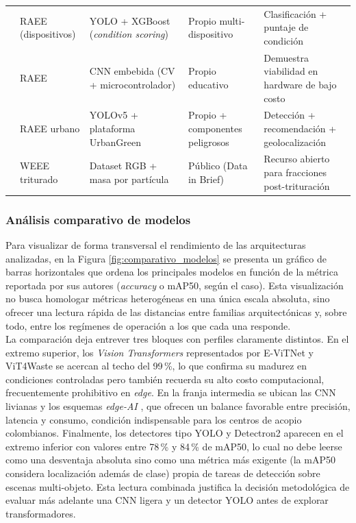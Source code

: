 \begin{table}[H]
{\begin{tabular}{p{3.4cm}p{2.6cm}p{3cm}p{3.5cm}p{4.5cm}}
\cite{menagaIntelligentDeviceCondition2026} & RAEE (dispositivos) & YOLO + XGBoost (\textit{condition scoring}) & Propio multi-dispositivo & Clasificación + puntaje de condición \\
\cite{ilievEmbeddedSystemEwaste2023} & RAEE & CNN embebida (CV + microcontrolador) & Propio educativo & Demuestra viabilidad en hardware de bajo costo \\
\cite{madusankaUrbanGreenEWasteDetection2025a} & RAEE urbano & YOLOv5 + plataforma UrbanGreen & Propio + componentes peligrosos & Detección + recomendación + geolocalización \\
\cite{vogelgesangMaterialFlowComposition2026} & WEEE triturado & Dataset RGB + masa por partícula & Público (Data in Brief) & Recurso abierto para fracciones post-trituración \\
\hline
\end{tabular}}
\end{table}

\subsubsection{Análisis comparativo de modelos}

Para visualizar de forma transversal el rendimiento de las arquitecturas analizadas, en la Figura \ref{fig:comparativo_modelos} se presenta un gráfico de barras horizontales que ordena los principales modelos en función de la métrica reportada por sus autores (\textit{accuracy} o mAP50, según el caso). Esta visualización no busca homologar métricas heterogéneas en una única escala absoluta, sino ofrecer una lectura rápida de las distancias entre familias arquitectónicas y, sobre todo, entre los regímenes de operación a los que cada una responde.\\

La comparación deja entrever tres bloques con perfiles claramente distintos. En el extremo superior, los \textit{Vision Transformers} representados por E-ViTNet \cite{oiseEViTNetLightweightVision2026} y ViT4Waste \cite{chauhanViT4WasteVisionTransformerBased2025} se acercan al techo del 99\,\%, lo que confirma su madurez en condiciones controladas pero también recuerda su alto costo computacional, frecuentemente prohibitivo en \textit{edge}. En la franja intermedia se ubican las CNN livianas y los esquemas \textit{edge-AI} \cite{jinGarbageDetectionClassification2023, p.sLowPowerEdgeAI2026, zhouMachineLearningClassification2022, donmez_benchmarking_2025}, que ofrecen un balance favorable entre precisión, latencia y consumo, condición indispensable para los centros de acopio colombianos. Finalmente, los detectores tipo YOLO y Detectron2 \cite{rajeevAdvancingEwasteClassification2025a, dengVisionbasedDetectionSystem2026a, midigudlaComparativeAnalysisDeep2025} aparecen en el extremo inferior con valores entre 78\,\% y 84\,\% de mAP50, lo cual no debe leerse como una desventaja absoluta sino como una métrica más exigente (la mAP50 considera localización además de clase) propia de tareas de detección sobre escenas multi-objeto. Esta lectura combinada justifica la decisión metodológica de evaluar más adelante una CNN ligera y un detector YOLO antes de explorar transformadores.

